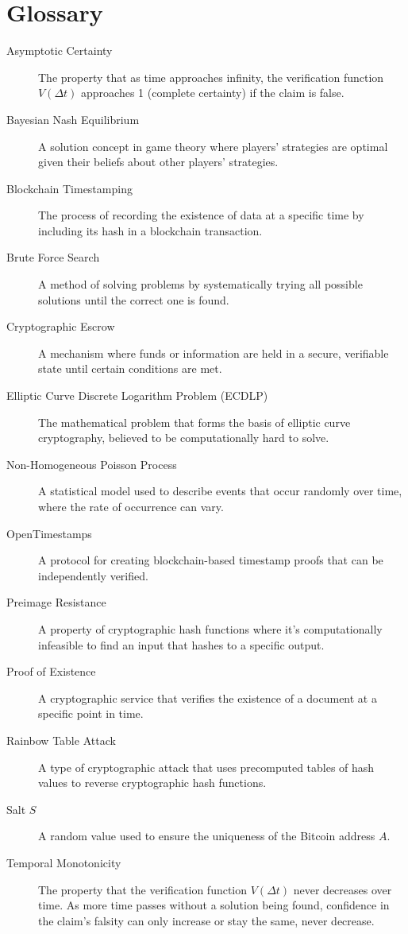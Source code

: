\documentclass[12pt]{report}
\begin{document}
\section*{Glossary}
\begin{description}
    \item[Asymptotic Certainty] The property that as time approaches infinity, the verification function \( V(\Delta t) \) approaches 1 (complete certainty) if the claim is false.
    \item[Bayesian Nash Equilibrium] A solution concept in game theory where players' strategies are optimal given their beliefs about other players' strategies.
    \item[Blockchain Timestamping] The process of recording the existence of data at a specific time by including its hash in a blockchain transaction.
    \item[Brute Force Search] A method of solving problems by systematically trying all possible solutions until the correct one is found.
    \item[Cryptographic Escrow] A mechanism where funds or information are held in a secure, verifiable state until certain conditions are met.
    \item[Elliptic Curve Discrete Logarithm Problem (ECDLP)] The mathematical problem that forms the basis of elliptic curve cryptography, believed to be computationally hard to solve.
    \item[Non-Homogeneous Poisson Process] A statistical model used to describe events that occur randomly over time, where the rate of occurrence can vary.
    \item[OpenTimestamps] A protocol for creating blockchain-based timestamp proofs that can be independently verified.
    \item[Preimage Resistance] A property of cryptographic hash functions where it's computationally infeasible to find an input that hashes to a specific output.
    \item[Proof of Existence] A cryptographic service that verifies the existence of a document at a specific point in time.
    \item[Rainbow Table Attack] A type of cryptographic attack that uses precomputed tables of hash values to reverse cryptographic hash functions.
    \item[Salt \( S \)] A random value used to ensure the uniqueness of the Bitcoin address \( A \).
    \item[Temporal Monotonicity] The property that the verification function \( V(\Delta t) \) never decreases over time. As more time passes without a solution being found, confidence in the claim's falsity can only increase or stay the same, never decrease.

\end{description}
\end{document}
